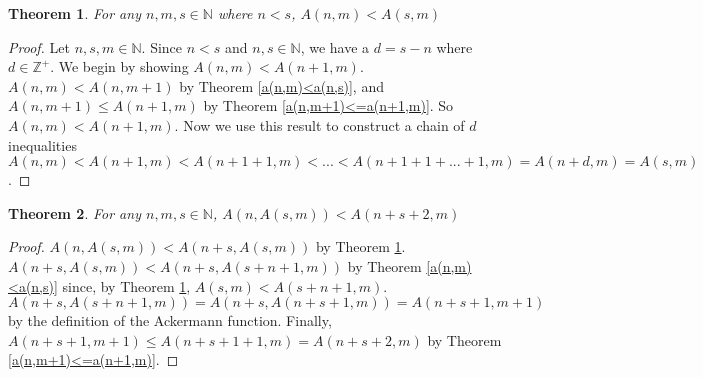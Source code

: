 \documentclass[12pt, letterpaper]{article}
\newtheorem{theorem}{Theorem}
\theoremstyle{case}
\newtheorem{case}{Case}
\begin{document}
    \begin{theorem}
      \label{a(n,m)<a(s,m)}
      For any $n, m, s \in \mathbb{N}$ where $n < s$, $A(n, m) < A(s, m)$
    \end{theorem}
    \begin{proof}
      Let $n, s, m \in \mathbb{N}$.
      Since $n < s$ and $n, s \in \mathbb{N}$, we have a $d = s - n$ where $d \in \mathbb{Z}^+$.
      We begin by showing $A(n, m) < A(n + 1, m)$.
      $A(n, m) < A(n, m + 1)$ by Theorem \ref{a(n,m)<a(n,s)},
      and $A(n, m + 1) \leq A(n + 1, m)$ by Theorem \ref{a(n,m+1)<=a(n+1,m)}.
      So $A(n, m) < A(n + 1, m)$.
      Now we use this result to construct a chain of $d$ inequalities $A(n, m) < A(n + 1, m) < A(n + 1 + 1, m) < ... < A(n + 1 + 1 + ... + 1, m)
      = A(n + d, m) = A(s, m)$.
    \end{proof}

    \begin{theorem}
      \label{plus2}
      For any $n, m, s \in \mathbb{N}$, $A(n, A(s, m)) < A(n + s + 2, m)$
    \end{theorem}
    \begin{proof}
      $A(n, A(s, m)) < A(n + s, A(s, m))$ by Theorem \ref{a(n,m)<a(s,m)}.
      $A(n + s, A(s, m)) < A(n + s, A(s + n + 1, m))$ by Theorem \ref{a(n,m)<a(n,s)} since, by Theorem \ref{a(n,m)<a(s,m)},
      $A(s, m) < A(s + n + 1, m)$.
      $A(n + s, A(s + n + 1, m)) = A(n + s, A(n + s + 1, m)) = A(n + s + 1, m + 1)$ by the definition of the Ackermann function.
      Finally, $A(n + s + 1, m + 1) \leq A(n + s + 1 + 1, m) = A(n + s + 2, m)$ by Theorem \ref{a(n,m+1)<=a(n+1,m)}.
    \end{proof}
\end{document}

